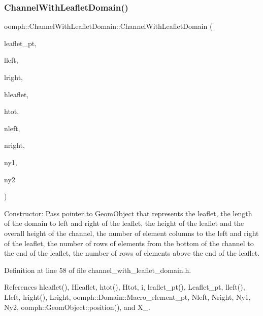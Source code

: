 \subsubsection{\texorpdfstring{Channel\+With\+Leaflet\+Domain()}{ChannelWithLeafletDomain()}}
{\footnotesize\ttfamily oomph\+::\+Channel\+With\+Leaflet\+Domain\+::\+Channel\+With\+Leaflet\+Domain (\begin{DoxyParamCaption}\item[{\hyperlink{classoomph_1_1GeomObject}{Geom\+Object} $\ast$}]{leaflet\+\_\+pt,  }\item[{const double \&}]{lleft,  }\item[{const double \&}]{lright,  }\item[{const double \&}]{hleaflet,  }\item[{const double \&}]{htot,  }\item[{const unsigned \&}]{nleft,  }\item[{const unsigned \&}]{nright,  }\item[{const unsigned \&}]{ny1,  }\item[{const unsigned \&}]{ny2 }\end{DoxyParamCaption})\hspace{0.3cm}{\ttfamily [inline]}}



Constructor\+: Pass pointer to \hyperlink{classoomph_1_1GeomObject}{Geom\+Object} that represents the leaflet, the length of the domain to left and right of the leaflet, the height of the leaflet and the overall height of the channel, the number of element columns to the left and right of the leaflet, the number of rows of elements from the bottom of the channel to the end of the leaflet, the number of rows of elements above the end of the leaflet. 



Definition at line 58 of file channel\+\_\+with\+\_\+leaflet\+\_\+domain.\+h.



References hleaflet(), Hleaflet, htot(), Htot, i, leaflet\+\_\+pt(), Leaflet\+\_\+pt, lleft(), Lleft, lright(), Lright, oomph\+::\+Domain\+::\+Macro\+\_\+element\+\_\+pt, Nleft, Nright, Ny1, Ny2, oomph\+::\+Geom\+Object\+::position(), and X\+\_.

\mbox{\label{classoomph_1_1ChannelWithLeafletDomain_a7f00e3d9ed53ca70519671446fe60510}} 
